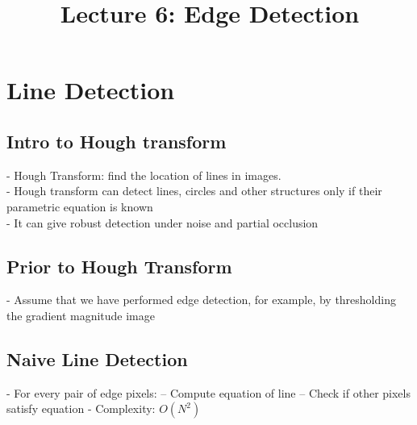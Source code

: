 \documentclass{article}
\title{Lecture 6: Edge Detection}
\begin{document}
\maketitle

\section*{Line Detection}
\subsection*{Intro to Hough transform}
- Hough Transform: find the location of lines in images. \\
- Hough transform can detect lines, circles and other structures only if their parametric equation is known \\
- It can give robust detection under noise and partial occlusion \\

\subsection*{Prior to Hough Transform}
- Assume that we have performed edge detection, for example, by thresholding the gradient magnitude image \\
\subsection*{Naive Line Detection}
- For every pair of edge pixels:
-- Compute equation of line
-- Check if other pixels satisfy equation
- Complexity: $O(N^2)$
\end{document}
